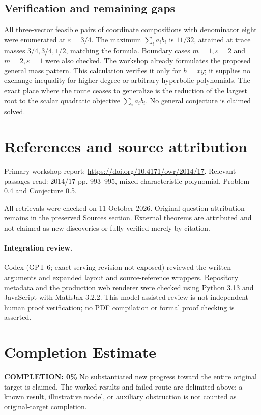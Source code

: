 \documentclass[11pt]{article}
\begin{document}
\subsection{Verification and remaining gaps}
All three-vector feasible pairs of coordinate compositions with denominator eight were enumerated at $\varepsilon=3/4$. The maximum $\sum_i a_ib_i$ is $11/32$, attained at trace masses $3/4,3/4,1/2$, matching the formula. Boundary cases $m=1,\varepsilon=2$ and $m=2,\varepsilon=1$ were also checked. The workshop already formulates the proposed general mass pattern. This calculation verifies it only for $h=xy$; it supplies no exchange inequality for higher-degree or arbitrary hyperbolic polynomials. The exact place where the route ceases to generalize is the reduction of the largest root to the scalar quadratic objective $\sum_i a_ib_i$. No general conjecture is claimed solved.

\section{References and source attribution}
Primary workshop report: \url{https://doi.org/10.4171/owr/2014/17}. Relevant passages read: 2014/17 pp. 993--995, mixed characteristic polynomial, Problem 0.4 and Conjecture 0.5.

All retrievals were checked on 11 October 2026. Original question attribution remains in the preserved Sources section. External theorems are attributed and not claimed as new discoveries or fully verified merely by citation.


\paragraph{Integration review.} Codex (GPT-6; exact serving revision not exposed) reviewed the written arguments and expanded layout and source-reference wrappers. Repository metadata and the production web renderer were checked using Python 3.13 and JavaScript with MathJax 3.2.2. This model-assisted review is not independent human proof verification; no PDF compilation or formal proof checking is asserted.

\section{Completion Estimate}
\noindent\textbf{COMPLETION: 0\%}
No substantiated new progress toward the entire original target is claimed. The worked results and failed route are delimited above; a known result, illustrative model, or auxiliary obstruction is not counted as original-target completion.
\end{document}
